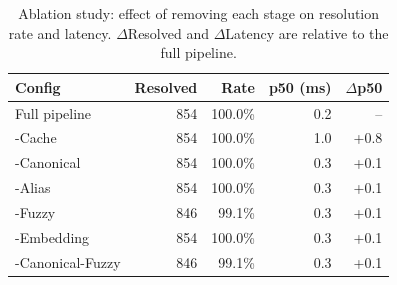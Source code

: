 \begin{table}[t]
\centering
\caption{Ablation study: effect of removing each stage on resolution rate and latency. $\Delta$Resolved and $\Delta$Latency are relative to the full pipeline.}
\label{tab:ablation}
\small
\begin{tabular}{@{}l rr rr@{}}
\toprule
\textbf{Config} & \textbf{Resolved} & \textbf{Rate} & \textbf{p50 (ms)} & \textbf{$\Delta$p50} \\
\midrule
Full pipeline & 854 & 100.0\% & 0.2 & -- \\
-Cache & 854 & 100.0\% & 1.0 & +0.8 \\
-Canonical & 854 & 100.0\% & 0.3 & +0.1 \\
-Alias & 854 & 100.0\% & 0.3 & +0.1 \\
-Fuzzy & 846 & 99.1\% & 0.3 & +0.1 \\
-Embedding & 854 & 100.0\% & 0.3 & +0.1 \\
-Canonical-Fuzzy & 846 & 99.1\% & 0.3 & +0.1 \\
\bottomrule
\end{tabular}
\end{table}
